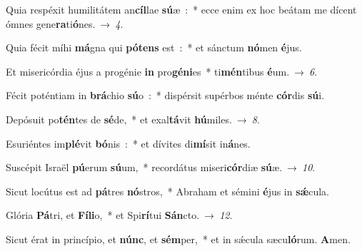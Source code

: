 ﻿\item Quia respéxit humilitátem an\textbf{cíl}\-lae \textbf{sú}\-æ~:~* ecce enim ex hoc beátam me dícent ómnes gene\textbf{ra}ti\textbf{ó}nes.~→~\emph{4}.
\item Quia fécit míhi \textbf{má}\-gna qui \textbf{pó}\-\textbf{tens} est~:~* et sánctum \textbf{nó}\-men \textbf{é}jus.
\item Et misericórdia éjus a progénie \textbf{in} pro\textbf{gé}\-\textbf{ni}\-es~* ti\textbf{mén}\-tibus \textbf{é}um.~→~\emph{6}.
\item Fécit poténtiam in \textbf{brá}\-chio \textbf{sú}\-o~:~* dispérsit supérbos ménte \textbf{cór}\-dis \textbf{sú}i.
\item Depósuit po\textbf{tén}\-tes de \textbf{sé}\-de,~* et exal\textbf{tá}\-vit \textbf{hú}miles.~→~\emph{8}.
\item Esuriéntes im\textbf{plé}\-vit \textbf{bó}\-nis~:~* et dívites di\textbf{mí}\-sit in\textbf{á}nes.
\item Suscépit Israël \textbf{pú}\-erum \textbf{sú}\-um,~* recordátus miseri\textbf{cór}\-diæ \textbf{sú}æ.~→~\emph{10}.
\item Sicut locútus est ad \textbf{pá}\-tres \textbf{nó}\-stros,~* Abraham et sémini \textbf{é}\-jus in \textbf{sǽ}cula.
\item Glória \textbf{Pá}\-tri, et \textbf{Fí}\-\textbf{li}\-o,~* et Spi\textbf{rí}\-tui \textbf{Sán}cto.~→~\emph{12}.
\item Sicut érat in princípio, et \textbf{núnc}, et \textbf{sém}\-per,~* et in sǽcula sæcu\textbf{ló}\-rum. \textbf{A}men.